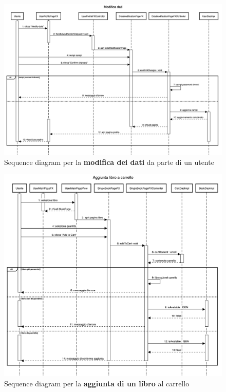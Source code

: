 \documentclass[12pt,a4paper]{article}
\begin{document}
	\newpage
	\begin{figure}[h!]
		\centering
		\includegraphics[scale=0.35]{images/SequenceDiagrams/AggiornamentoDati.png}
		\caption{Sequence diagram per la \textbf{modifica dei dati} da parte di un utente}
	\end{figure}
	\newpage
	\begin{figure}[h!]
		\centering
		\includegraphics[scale=0.35]{images/SequenceDiagrams/AggiuntaLibro.png}
		\caption{Sequence diagram per la \textbf{aggiunta di un libro} al carrello}
	\end{figure}
	\newpage
\end{document}
